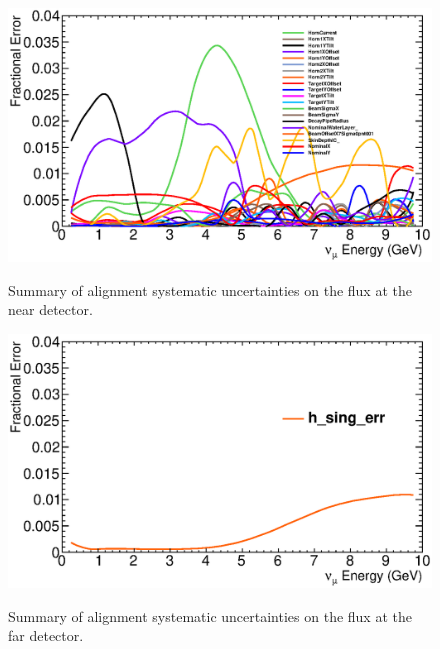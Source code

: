 \begin{figure}[ht]
  \label{fig:error_summary_near}

  \begin{center}
    {\includegraphics[width=6.0in]{figures/error_summary_near.eps}}
  \end{center}
\caption{ Summary of alignment systematic uncertainties on the flux at the near detector.}
\end{figure}

\begin{figure}[ht]
  \label{fig:error_summary_far}
  \begin{center}
    {\includegraphics[width=6.0in]{figures/error_summary_far.eps}}
  \end{center}
\caption{ Summary of alignment systematic uncertainties on the flux at the far detector.}
\end{figure}

